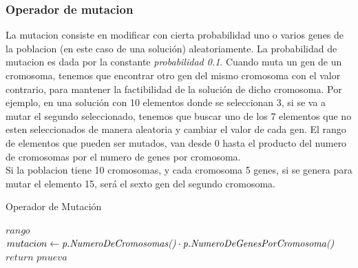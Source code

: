 \documentclass{article}
\begin{document}
\subsubsection{\scriptsize Operador de mutacion}
La mutacion consiste en modificar con cierta probabilidad uno o varios genes de la poblacion (en este caso de una solución)
aleatoriamente. La probabilidad de mutacion es dada por la constante \emph{probabilidad 0.1}.
Cuando muta un gen de un cromosoma, tenemos que encontrar otro gen del mismo cromosoma con el valor contrario,
para mantener la factibilidad de la solución de dicho cromosoma.
Por ejemplo, en una solución con 10 elementos donde se seleccionan 3, si se va a mutar el segundo seleccionado, tenemos que buscar uno de los 7
elementos que no esten seleccionados de manera aleatoria y cambiar el valor de cada gen.
El rango de elementos que pueden ser mutados, van desde 0 hasta el producto del numero de cromosomas por el numero de genes 
por cromosoma.\\
Si la poblacion tiene 10 cromosomas, y cada cromosoma 5 genes, si se genera para mutar el elemento 15, será el sexto gen del segundo cromosoma.

\begin{algorithm}[H]
  \scriptsize
  \label{Operador de Mutacion}
  \caption{Operador de Mutación}
\vspace{3mm}

$rango$ $mutacion \leftarrow \emph{p.NumeroDeCromosomas()} \cdot \emph{p.NumeroDeGenesPorCromosoma()} $\\

$return$ $pnueva$\\ 

\end{algorithm}
\vspace {3mm}
\end{document}

